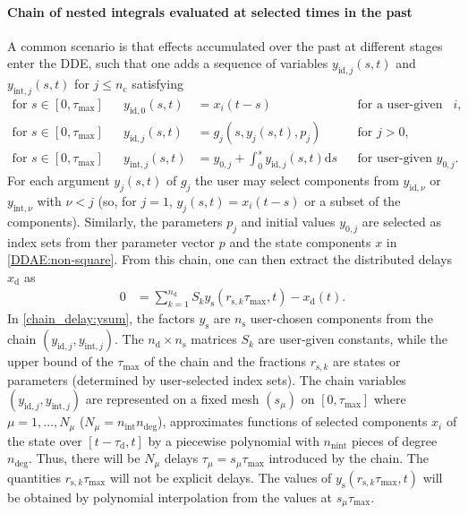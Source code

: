 \documentclass[10pt]{scrartcl}
\renewcommand{\d}{\mathrm{d}}
\begin{document}
\paragraph{Chain of nested integrals evaluated at selected times in the past}
A common scenario is that effects accumulated over the past at different stages enter the DDE, such that one adds a sequence of variables $y_{\mathrm{id},j}(s,t)$ and
$y_{\mathrm{int},j}(s,t)$ for $j\leq n_\mathrm{c}$ satisfying
\begin{align}
  \label{chain_delay:yid0}
  \mbox{for\ }s\in[0,\tau_{\max}]&&y_{\mathrm{id},0}(s,t)&=x_i(t-s)&&\mbox{for a user-given index set $i$,}\\
  \label{chain_delay:yid}
  \mbox{for\ }s\in[0,\tau_{\max}]&&  y_{\mathrm{id},j}(s,t)&=g_j(s,y_j(s,t),p_j)&&\mbox{for $j>0$,}\\
  \label{chain_delay:yint}
  \mbox{for\ }s\in[0,\tau_{\max}]&&  y_{\mathrm{int},j}(s,t)&=y_{0,j}+\int_0^s y_{\mathrm{id},j}(s,t)\d s&&\mbox{for user-given $y_{0,j}$.}
\end{align}
For each argument $y_j(s,t)$ of $g_j$ the user may select components
from $y_{\mathrm{id},\nu}$ or $y_{\mathrm{int},\nu}$ with $\nu<j$ (so,
for $j=1$, $y_j(s,t)=x_i(t-s)$ or a subset of the
components). Similarly, the parameters $p_j$ and initial values
$y_{0,j}$ are selected as index sets from ther parameter vector $p$
and the state components $x$ in \eqref{DDAE:non-square}. From this
chain, one can then extract the distributed delays $x_\mathrm{d}$ as
\begin{align}
  \label{chain_delay:ysum}
  0&=\sum_{k=1}^{n_\mathrm{d}}S_ky_{\mathrm{s}}(r_{\mathrm{s},k}\tau_{\max},t)-x_\mathrm{d}(t).
\end{align}
In \eqref{chain_delay:ysum}, the factors $y_\mathrm{s}$ are
$n_\mathrm{s}$ user-chosen components from the chain
$(y_{\mathrm{id},j},y_{\mathrm{int},j})$. The
$n_\mathrm{d}\times n_\mathrm{s}$ matrices $S_k$ are user-given
constants, while the upper bound of the $\tau_{\max}$ of the chain and
the fractions $r_{\mathrm{s},k}$ are states or parameters (determined
by user-selected index sets). The chain variables
$(y_{\mathrm{id},j},y_{\mathrm{int},j})$ are represented on a fixed
mesh $(s_\mu)$ on $[0,\tau_{\max}]$ where $\mu=1,\ldots,N_\mu$
($N_\mu=n_\mathrm{int}n_\mathrm{deg}$), approximates functions of
selected components $x_i$ of the state over $[t-\tau_\mathrm{d},t]$ by
a piecewise polynomial with $n_\mathrm{nint}$ pieces of degree
$n_\mathrm{deg}$. Thus, there will be $N_\mu$ delays
$\tau_\mu=s_\mu\tau_{\max}$ introduced by the chain. The quantities $r_{\mathrm{s},k}\tau_{\max}$ will not be explicit delays. The values of $y_\mathrm{s}(r_{\mathrm{s},k}\tau_{\max},t)$ will be obtained by polynomial interpolation from the values at $s_\mu\tau_{\max}$.
\end{document}
